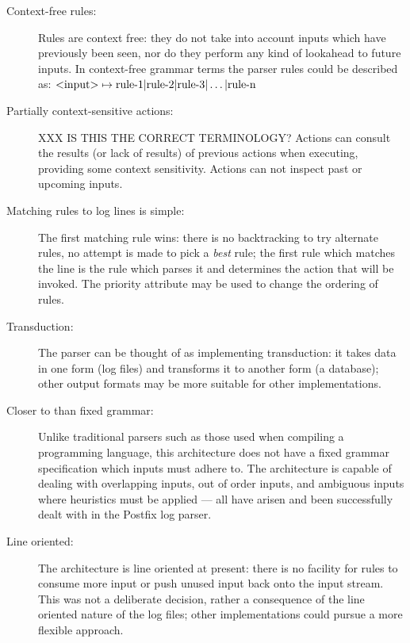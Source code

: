 \documentclass[draft]{svmult}
\begin{document}
\begin{description}

    \item [Context-free rules:]  Rules are context free: they do not take
        into account inputs which have previously been seen, nor do they
        perform any kind of lookahead to future inputs.  In context-free
        grammar terms the parser rules could be described as:
        $\text{\textless{}input\textgreater{}} \mapsto \text{rule-1} |
        \text{rule-2} | \text{rule-3} | \dots | \text{rule-n}$

    \item [Partially context-sensitive actions:]  XXX IS THIS THE CORRECT
        TERMINOLOGY\@?  Actions can consult the results (or lack of
        results) of previous actions when executing, providing some context
        sensitivity.  Actions can not inspect past or upcoming inputs.

    \item [Matching rules to log lines is simple:]  The first matching rule
        wins: there is no backtracking to try alternate rules, no attempt
        is made to pick a \textit{best\/} rule; the first rule which
        matches the line is the rule which parses it and determines the
        action that will be invoked.  The priority attribute may be used to
        change the ordering of rules.

    \item [Transduction:]  The parser can be thought of as implementing
        transduction: it takes data in one form (log files) and transforms
        it to another form (a database); other output formats may be more
        suitable for other implementations.

    \item [Closer to \NLP{} than fixed grammar:]  Unlike traditional
        parsers such as those used when compiling a programming language,
        this architecture does not have a fixed grammar specification which
        inputs must adhere to.  The architecture is capable of dealing with
        overlapping inputs, out of order inputs, and ambiguous inputs where
        heuristics must be applied --- all have arisen and been
        successfully dealt with in the Postfix log parser.

    \item [Line oriented:]  The architecture is line oriented at present:
        there is no facility for rules to consume more input or push unused
        input back onto the input stream.  This was not a deliberate
        decision, rather a consequence of the line oriented nature of the
        log files; other implementations could pursue a more flexible
        approach.

\end{description}
\end{document}
